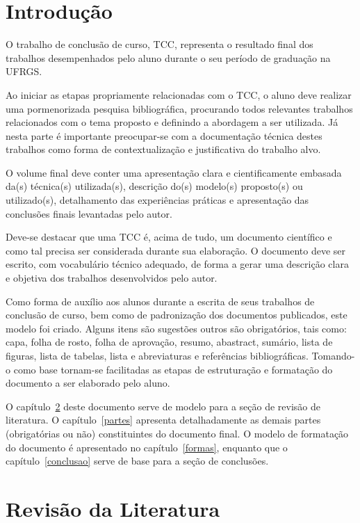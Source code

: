 \documentclass[repeatfields,xlists,xpacks,oneside,yearsonly]{ufrgscca}
\begin{document}
\tableofcontents



\chapter{Introdução}

O trabalho de conclusão de curso, TCC,  representa o resultado
final dos trabalhos desempenhados pelo aluno durante o seu período de graduação na UFRGS.

Ao iniciar as etapas propriamente relacionadas com o TCC,
o aluno deve realizar uma pormenorizada pesquisa bibliográfica, procurando
todos relevantes trabalhos relacionados com o tema proposto e definindo a
abordagem a ser utilizada. Já nesta parte é importante preocupar-se com a
documentação técnica destes trabalhos como forma de contextualização e
justificativa do trabalho  alvo.

O volume final deve conter uma apresentação clara e cientificamente embasada
da(s) técnica(s) utilizada(s), descrição do(s) modelo(s) proposto(s) ou
utilizado(s), detalhamento das experiências práticas e apresentação das
conclusões finais levantadas pelo autor.

Deve-se destacar que uma TCC é,
acima de tudo, um documento científico e como tal precisa ser considerada
durante sua elaboração. O documento deve ser escrito, com vocabulário
técnico adequado, de forma a gerar uma descrição clara e objetiva dos
trabalhos desenvolvidos pelo autor.

Como forma de auxílio aos alunos durante a escrita de seus trabalhos de conclusão de curso, bem como de padronização dos documentos publicados, este modelo foi criado. Alguns itens são sugestões outros são
obrigatórios, tais como: capa, folha de rosto, folha de aprovação, resumo,
abastract, sumário, lista de figuras, lista de tabelas, lista e abreviaturas
e referências bibliográficas. Tomando-o como base tornam-se facilitadas as
etapas de estruturação e formatação do documento a ser elaborado pelo aluno.

O capítulo~\ref{revisao} deste documento serve de modelo para a seção de
revisão de literatura. O capítulo~\ref{partes} apresenta detalhadamente
as demais partes (obrigatórias ou não) constituintes do documento final. O
modelo de formatação do documento é apresentado no capítulo~\ref{formas},
enquanto que o capítulo~\ref{conclusao} serve de base para a seção de
conclusões.

\chapter{Revisão da Literatura}
\label{revisao}
\end{document}
